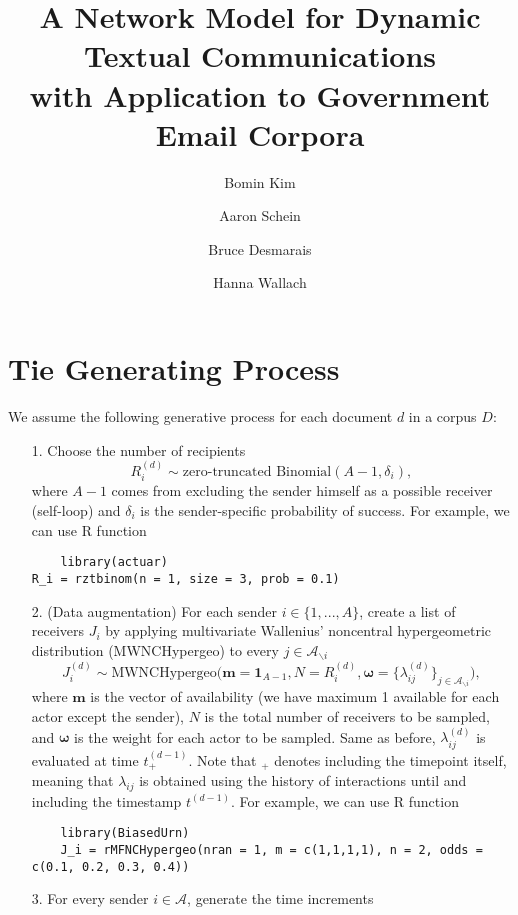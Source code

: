\documentclass[a4paper]{article}
\title{A Network Model for Dynamic Textual Communications \\with Application to
	Government Email Corpora}
\author[1]{Bomin Kim}
\author[3]{Aaron Schein}
\author[1]{Bruce Desmarais}
\author[2,3]{Hanna Wallach}
\affil[1]{Pennsylvania State University}
\affil[2]{Microsoft Research NYC}
\affil[3]{University of Massachusetts Amherst}
\begin{document}
\maketitle
\section{Tie Generating Process}\label{subsec: Tie Generating Process}
We assume the following generative process for each document $d$ in a corpus $D$:
\begin{itemize}
	\item[1.] Choose the number of recipients
	\begin{equation}
	R_i^{(d)} \sim \mbox{zero-truncated Binomial}(A-1, \delta_i),
	\end{equation}
	where $A-1$ comes from excluding the sender himself as a possible receiver (self-loop) and $\delta_i$ is the sender-specific probability of success. For example, we can use R function
	\begin{verbatim}
	library(actuar)
R_i = rztbinom(n = 1, size = 3, prob = 0.1)
	\end{verbatim}
	\item[2.] (Data augmentation) For each sender $i \in \{1,...,A\}$, create a list of receivers $J_i$ by applying multivariate Wallenius' noncentral hypergeometric distribution (MWNCHypergeo) to every $j \in \mathcal{A}_{\backslash i}$
	\begin{equation} 
	J^{(d)}_i\sim \mbox{MWNCHypergeo}\Big(\boldsymbol{m} =\mathbf{1}_{A-1}, N = R_i^{(d)}, \boldsymbol{\omega} =\{\lambda_{ij}^{(d)}\}_{j \in \mathcal{A}_{\backslash i}} \Big),
	\end{equation}
	where $\mathbf{m}$ is the vector of availability (we have maximum 1 available for each actor except the sender), $N$ is the total number of receivers to be sampled, and $\boldsymbol{\omega}$ is the weight for each actor to be sampled. Same as before, $\lambda^{(d)}_{ij}$ is evaluated at time $t_+^{(d-1)}$. Note that $_+$ denotes including the timepoint itself, meaning that $\lambda_{ij}$ is obtained using the history of interactions until and including the timestamp $t^{(d-1)}$. For example, we can use R function
	\begin{verbatim}
	library(BiasedUrn)
	J_i = rMFNCHypergeo(nran = 1, m = c(1,1,1,1), n = 2, odds = c(0.1, 0.2, 0.3, 0.4))
	\end{verbatim}
	\item[3.] For every sender $i \in \mathcal{A}$, generate the time increments \begin{equation}

\end{equation}
\end{itemize}
\end{document}
